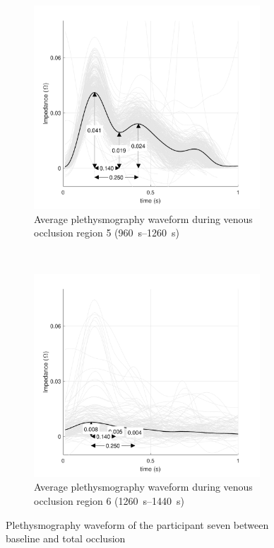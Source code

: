 \begin{figure}[t!]
	\centering
	\begin{subfigure}[t]{0.5\textwidth}
		\centering
		\includegraphics[height=7.6cm]{figure10a}
		\caption{Average plethysmography waveform during venous occlusion region 5 (\SIrange{960}{1260}{\second})}
		\label{fig:iPG_total_baseline}
	\end{subfigure}%
	~ 
	\begin{subfigure}[t]{0.5\textwidth}
		\centering
		\includegraphics[height=7.6cm]{figure10b}
		\caption{Average plethysmography waveform during venous occlusion region 6 (\SIrange{1260}{1440}{\second})}
		\label{fig:iPG_total_occlusion}
	\end{subfigure}
	\caption{Plethysmography waveform of the participant seven between baseline and total occlusion}
	\label{fig:iPG_total}
\end{figure}

